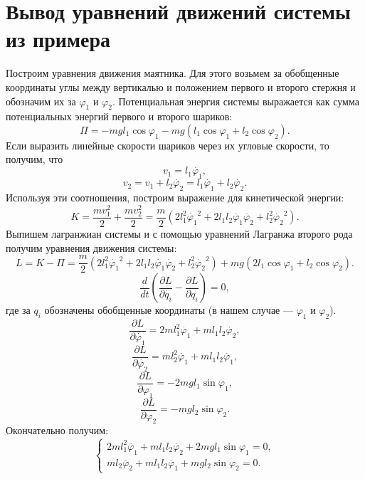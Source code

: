 \documentclass[a4paper, 14pt]{article}
\begin{document}
\section{Вывод уравнений движений системы из примера}
        Построим уравнения движения маятника. Для этого возьмем за обобщенные координаты углы между вертикалью и положением первого и второго стержня и обозначим их за $\varphi_1$ и $\varphi_2$.
        Потенциальная энергия системы выражается как сумма потенциальных энергий первого и второго шариков:
        $$
            \Pi = - m g l_1 \cos \varphi_1 - m g (l_1 \cos \varphi_1 + l_2 \cos \varphi_2).
        $$
        Если выразить линейные скорости шариков через их угловые скорости, то получим, что
        $$
            v_1 = l_1 \dot{\varphi_1},
        $$
        $$
            v_2 = v_1 + l_2 \dot{\varphi_2} = l_1 \dot{\varphi_1} + l_2 \dot{\varphi_2}.
        $$
        Используя эти соотношения, построим выражение для кинетической энергии:
        $$
            K = \dfrac{m v_1^2}{2} + \dfrac{m v_2^2}{2} = \dfrac{m}{2} \left( 2 l_1^2 \dot{\varphi_1}^2 + 2 l_1 l_2 \dot{\varphi_1} \dot{\varphi_2} +  l_2^2 \dot{\varphi_2}^2\right).
        $$
        Выпишем лагранжиан системы и с помощью уравнений Лагранжа второго рода получим уравнения движения системы:
        $$
            L = K - \Pi = \dfrac{m}{2} \left( 2 l_1^2 \dot{\varphi_1}^2 + 2 l_1 l_2 \dot{\varphi_1} \dot{\varphi_2} +  l_2^2 \dot{\varphi_2}^2\right) + m g (2 l_1 \cos \varphi_1 + l_2 \cos \varphi_2).
        $$
        $$
            \dfrac{d}{dt} \left( \dfrac{\partial L}{\partial \dot{q_i}} - \dfrac{\partial L}{\partial q_i} \right) = 0,
        $$
        где за $q_i$ обозначены обобщенные координаты (в нашем случае --- $\varphi_1$ и $\varphi_2$).
        $$
            \dfrac{\partial L}{\partial \dot{\varphi_1}} = 2 m l_1^2 \dot{\varphi_1} + m l_1 l_2 \dot{\varphi_2},
        $$
        $$
            \dfrac{\partial L}{\partial \dot{\varphi_2}} = m l_2^2 \dot{\varphi_1} + m l_1 l_2 \dot{\varphi_1},
        $$
        $$
            \dfrac{\partial L}{\partial \varphi_1} = - 2 m g l_1 \sin \varphi_1,
        $$
        $$
            \dfrac{\partial L}{\partial \varphi_2} = - m g l_2 \sin \varphi_2.
        $$
        Окончательно получим:
        $$
            \begin{cases}
                2 m l_1^2 \ddot{\varphi_1} + m l_1 l_2 \ddot{\varphi_2} + 2 m g l_1 \sin \varphi_1 = 0, \\
                m l_2 \ddot{\varphi_2} + m l_1 l_2 \ddot{\varphi_1} + m g l_2 \sin \varphi_2 = 0.
            \end{cases}
        $$
\end{document}
